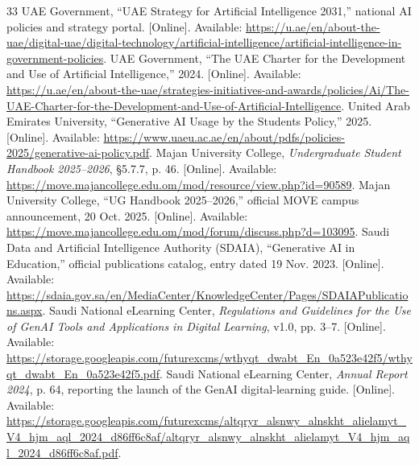 \documentclass[conference,letterpaper]{IEEEtran}
\begin{document}
\begin{thebibliography}{33}
 UAE Government, ``UAE Strategy for Artificial Intelligence 2031,'' national AI policies and strategy portal. [Online]. Available: \url{https://u.ae/en/about-the-uae/digital-uae/digital-technology/artificial-intelligence/artificial-intelligence-in-government-policies}.
 UAE Government, ``The UAE Charter for the Development and Use of Artificial Intelligence,'' 2024. [Online]. Available: \url{https://u.ae/en/about-the-uae/strategies-initiatives-and-awards/policies/Ai/The-UAE-Charter-for-the-Development-and-Use-of-Artificial-Intelligence}.
 United Arab Emirates University, ``Generative AI Usage by the Students Policy,'' 2025. [Online]. Available: \url{https://www.uaeu.ac.ae/en/about/pdfs/policies-2025/generative-ai-policy.pdf}.
 Majan University College, \emph{Undergraduate Student Handbook 2025--2026}, \S5.7.7, p. 46. [Online]. Available: \url{https://move.majancollege.edu.om/mod/resource/view.php?id=90589}.
 Majan University College, ``UG Handbook 2025--2026,'' official MOVE campus announcement, 20 Oct. 2025. [Online]. Available: \url{https://move.majancollege.edu.om/mod/forum/discuss.php?d=103095}.
 Saudi Data and Artificial Intelligence Authority (SDAIA), ``Generative AI in Education,'' official publications catalog, entry dated 19 Nov. 2023. [Online]. Available: \url{https://sdaia.gov.sa/en/MediaCenter/KnowledgeCenter/Pages/SDAIAPublications.aspx}.
 Saudi National eLearning Center, \emph{Regulations and Guidelines for the Use of GenAI Tools and Applications in Digital Learning}, v1.0, pp. 3--7. [Online]. Available: \url{https://storage.googleapis.com/futurexcms/wthyqt_dwabt_En_0a523e42f5/wthyqt_dwabt_En_0a523e42f5.pdf}.
 Saudi National eLearning Center, \emph{Annual Report 2024}, p. 64, reporting the launch of the GenAI digital-learning guide. [Online]. Available: \url{https://storage.googleapis.com/futurexcms/altqryr_alsnwy_alnskht_alielamyt_V4_hjm_aql_2024_d86ff6c8af/altqryr_alsnwy_alnskht_alielamyt_V4_hjm_aql_2024_d86ff6c8af.pdf}.
\end{thebibliography}
\end{document}
